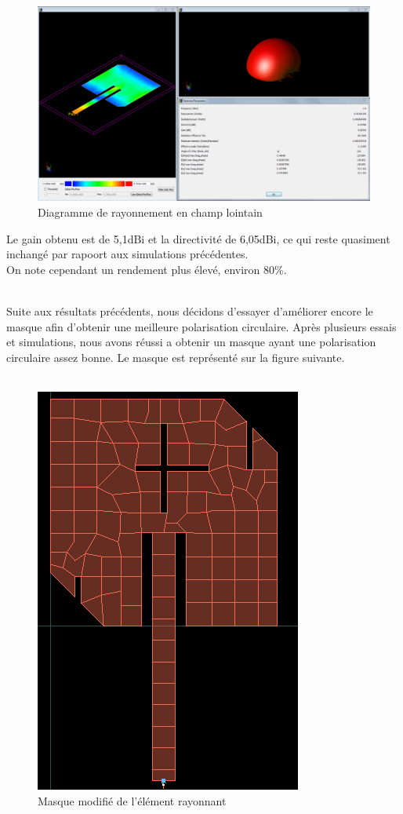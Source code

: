 \documentclass[16pt,a4paper,oneside,titlepage]{report}
\begin{document}
\begin{figure}[h]
\center
\includegraphics[scale=0.3]{Images/P3_Q9-2.png}
\caption{Diagramme de rayonnement en champ lointain}
\end{figure}

Le gain obtenu est de 5,1dBi et la directivité de 6,05dBi, ce qui reste quasiment inchangé par rapoort aux simulations précédentes. \\
On note cependant un rendement plus élevé, environ 80\%.\\\\
\newpage

Suite aux résultats précédents, nous décidons d'essayer d'améliorer encore le masque afin d'obtenir une meilleure polarisation circulaire. Après plusieurs essais et simulations, nous avons réussi a obtenir un masque ayant une polarisation circulaire assez bonne. Le masque est représenté sur la figure suivante.\\\\

\begin{figure}[h]
\center
\includegraphics[scale=0.5]{Images/P3_Q9-BON.png}
\caption{Masque modifié de l'élément rayonnant}
\end{figure}
\end{document}
